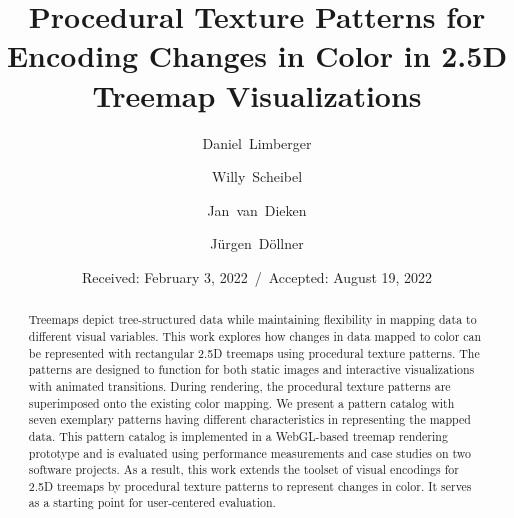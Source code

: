 \documentclass[smallextended,natbib]{svjour3}       %
\begin{document}
\title{Procedural Texture Patterns for Encoding Changes in Color in 2.5D Treemap Visualizations}


\author{Daniel~Limberger \and Willy~Scheibel \and Jan~van~Dieken \and J{\"u}rgen~D{\"o}llner}



\date{Received: February 3, 2022~/~Accepted: August 19, 2022}

\maketitle

\begin{abstract}
    Treemaps depict tree-structured data while maintaining flexibility in mapping data to different visual variables.
    This work explores how changes in data mapped to color can be represented with rectangular 2.5D treemaps using procedural texture patterns.
    The patterns are designed to function for both static images and interactive visualizations with animated transitions.
    During rendering, the procedural texture patterns are superimposed onto the existing color mapping.
    We present a pattern catalog with seven exemplary patterns having different characteristics in representing the mapped data. This pattern catalog is implemented in a WebGL-based treemap rendering prototype and is evaluated using performance measurements and case studies on two software projects.
    As a result, this work extends the toolset of visual encodings for 2.5D treemaps by procedural texture patterns to represent changes in color. It serves as a starting point for user-centered evaluation.
\end{abstract}
\end{document}
